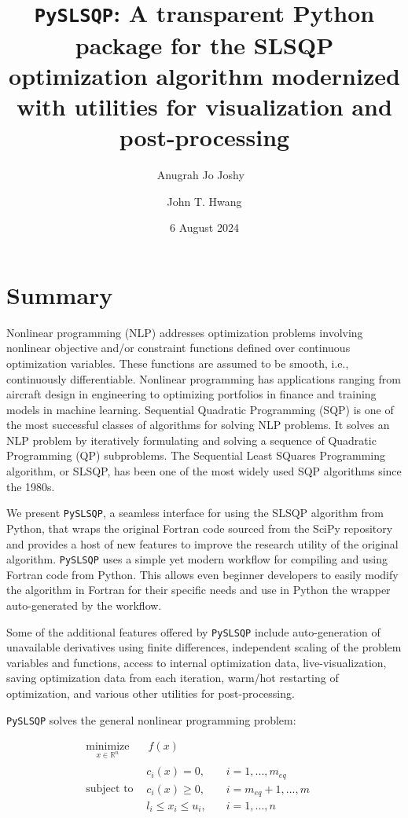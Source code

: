\documentclass[
]{article}
\title{\texttt{PySLSQP}: A transparent Python package for the SLSQP
optimization algorithm modernized with utilities for visualization and
post-processing}
\author[1%
  ]{Anugrah Jo Joshy%
    \,\orcidlink{0009-0003-7704-2532}\,%
    }
\author[2%
  ]{John T. Hwang%
    }
\affil[1]{PhD Candidate, Department of Mechanical and Aerospace
Engineering, University of California San Diego%
  }
\affil[2]{Associate Professor, Department of Mechanical and Aerospace
Engineering, University of California San Diego%
  }
\date{6 August 2024}
\begin{document}
\maketitle

\section{Summary}\label{summary}

Nonlinear programming (NLP) addresses optimization problems involving
nonlinear objective and/or constraint functions defined over continuous
optimization variables. These functions are assumed to be smooth, i.e.,
continuously differentiable. Nonlinear programming has applications
ranging from aircraft design in engineering to optimizing portfolios in
finance and training models in machine learning. Sequential Quadratic
Programming (SQP) is one of the most successful classes of algorithms
for solving NLP problems. It solves an NLP problem by iteratively
formulating and solving a sequence of Quadratic Programming (QP)
subproblems. The Sequential Least SQuares Programming algorithm, or
SLSQP, has been one of the most widely used SQP algorithms since the
1980s.

We present \texttt{PySLSQP}, a seamless interface for using the SLSQP
algorithm from Python, that wraps the original Fortran code sourced from
the SciPy repository and provides a host of new features to improve the
research utility of the original algorithm. \texttt{PySLSQP} uses a
simple yet modern workflow for compiling and using Fortran code from
Python. This allows even beginner developers to easily modify the
algorithm in Fortran for their specific needs and use in Python the
wrapper auto-generated by the workflow.

Some of the additional features offered by \texttt{PySLSQP} include
auto-generation of unavailable derivatives using finite differences,
independent scaling of the problem variables and functions, access to
internal optimization data, live-visualization, saving optimization data
from each iteration, warm/hot restarting of optimization, and various
other utilities for post-processing.

\texttt{PySLSQP} solves the general nonlinear programming problem:

\[
\begin{array}{rlr}
\underset{x \in \mathbb{R}^n}{\text{minimize}} & \; \; f(x) & \\
\text{subject to} & \begin{array}{ll}
                      c_i(x) = 0, &\quad i = 1,...,m_{eq} \\
                      c_i(x) \geq 0, &\quad i = m_{eq}+1,...,m \\
                      l_i \leq x_i \leq u_i, &\quad i = 1,...,n
                    \end{array}
\end{array}
\]
\end{document}
